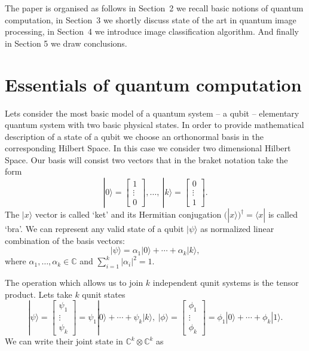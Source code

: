 \documentclass[a4paper,10pt]{llncs}
\newcommand{\ket}[1]{| #1 \rangle}
\newcommand{\bra}[1]{\langle #1 |}
\newcommand{\1}{\mathbb{1}}
\newcommand{\Complex}{\mathbb{C}}
\begin{document}
The paper is organised as follows in Section~2 we recall basic notions of
quantum computation, in Section~3 we shortly discuss state of the art in quantum
image processing, in Section~4 we introduce image classification algorithm. And
finally in Section 5 we draw conclusions.
\section{Essentials of quantum computation}
Lets consider the most basic model of a quantum system -- a qubit --
elementary quantum system with two basic physical states. In order to provide 
mathematical description of a state of a qubit we choose an orthonormal 
basis in the 
corresponding Hilbert Space. In 
this case we consider two dimensional Hilbert Space. Our basis will consist two 
vectors that in the braket notation take the form
\begin{equation}
\ket{0}=\left[\begin{array}{c}
1\\
\vdots\\
0
\end{array}\right],\ldots,\  \ket{k}=\left[\begin{array}{c}
0\\
\vdots\\
1
\end{array}\right].
\end{equation}
The $\ket{x}$ vector is called `ket' and its Hermitian conjugation 
$(\ket{x})^\dagger=\bra{x}$ is called `bra'.
We can represent any valid state of a qubit $\ket{\psi}$ as normalized linear 
combination of the 
basis 
vectors:
\begin{equation}
\ket{\psi}=\alpha_1\ket{0}+\cdots +\alpha_k\ket{k},
\end{equation}
where $\alpha_1,\ldots ,\alpha_k\in\mathbb{C}$ and $\sum\limits_{i=1}^{k}|\alpha_i|^2=1$.



The operation which allows us to join $k$ independent qunit systems is the 
tensor 
product. Lets take $k$ qunit
states 
\begin{equation}
\ket{\psi}=\left[\begin{array}{c}
\psi_1\\
\vdots\\
\psi_k
\end{array}\right]=\psi_1\ket{0}+\cdots +\psi_k\ket{k},\ \ket{\phi}=\left[\begin{array}{c}
\phi_1\\
\vdots\\
\phi_k
\end{array}\right]=\phi_1\ket{0}+\cdots +\phi_k\ket{1}.
\end{equation}
We can write their joint state in $\Complex^k\otimes\Complex^k$ as
\end{document}
